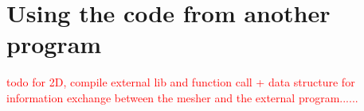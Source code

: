 \documentclass[10pt]{article}
\begin{document}
\section{Using the code from another program}
\label{inside}
%
\textcolor{red}{todo for 2D, compile external lib and function call + data structure for information exchange between the mesher and the external program......}

%
%
%
%
%
%
\end{document}
